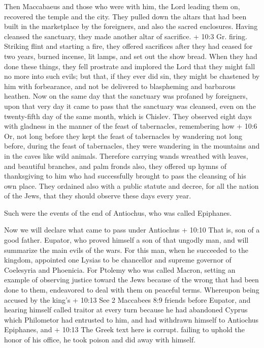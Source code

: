  Then Maccabaeus and those who were with him, the Lord
leading them on, recovered the temple and the city.  They
pulled down the altars that had been built in the marketplace by the
foreigners, and also the sacred enclosures.  Having cleansed
the sanctuary, they made another altar of sacrifice. + 10:3 Gr. firing.
Striking flint and starting a fire, they offered sacrifices after they
had ceased for two years, burned incense, lit lamps, and set out the
show bread.  When they had done these things, they fell
prostrate and implored the Lord that they might fall no more into such
evils; but that, if they ever did sin, they might be chastened by him
with forbearance, and not be delivered to blaspheming and barbarous
heathen.  Now on the same day that the sanctuary was
profaned by foreigners, upon that very day it came to pass that the
sanctuary was cleansed, even on the twenty-fifth day of the same month,
which is Chislev.  They observed eight days with gladness in
the manner of the feast of tabernacles, remembering how + 10:6 Or, not
long before they kept the feast of tabernacles by wandering not long
before, during the feast of tabernacles, they were wandering in the
mountains and in the caves like wild animals.  Therefore
carrying wands wreathed with leaves, and beautiful branches, and palm
fronds also, they offered up hymns of thanksgiving to him who had
successfully brought to pass the cleansing of his own place.
 They ordained also with a public statute and decree, for
all the nation of the Jews, that they should observe these days every
year.

 Such were the events of the end of Antiochus, who was
called Epiphanes.

 Now we will declare what came to pass under Antiochus +
10:10 That is, son of a good father. Eupator, who proved himself a son
of that ungodly man, and will summarize the main evils of the wars.
 For this man, when he succeeded to the kingdom, appointed
one Lysias to be chancellor and supreme governor of Coelesyria and
Phoenicia.  For Ptolemy who was called Macron, setting an
example of observing justice toward the Jews because of the wrong that
had been done to them, endeavored to deal with them on peaceful terms.
 Whereupon being accused by the king's + 10:13 See 2
Maccabees 8:9 friends before Eupator, and hearing himself called traitor
at every turn because he had abandoned Cyprus which Philometor had
entrusted to him, and had withdrawn himself to Antiochus Epiphanes, and
+ 10:13 The Greek text here is corrupt. failing to uphold the honor of
his office, he took poison and did away with himself.

